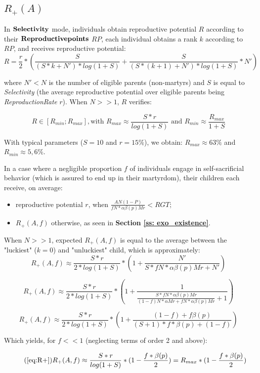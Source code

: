 \documentclass[a4paper,12pt]{report}
\begin{document}
\subsection{$R_{+}(A)$}
\label{ss:R+}
In $\bf{Selectivity}$ mode, individuals obtain reproductive potential $R$ according to their
$\bf{Reproductive points}$ $RP$, each individual obtains a rank $k$
according to $RP$, and receives reproductive potential:
\[ R = \frac{r}{2} * (\frac{S}
{(S*k + N')*log(1+S)} + \frac{S}{(S*(k+1) + N')*log(1+S)}*N') \]

where $N'<N$ is the number of eligible parents (non-martyrs) and $S$ is equal to \emph{Selectivity}
(the average reproductive potential over eligible parents being \emph{ReproductionRate} $r$).
When $N >> 1$, $R$ verifies:

\begin{equation}
    R \in [R_{min};R_{max}], \textrm{with } R_{max} \approx \frac{S*r}{log(1+S)} 
    \textrm{ and } R_{min} \approx
    \frac{R_{max}}{1+S}
\label{eq:ReproPot}
\end{equation}

With typical parameters ($S=10$ and $r=15\%$), we obtain: $R_{max} \approx 63 \%$ and 
$R_{min} \approx 5,6 \%$.

In a case where a negligible proportion $f$ of individuals engage in
self-sacrificial behavior (which is assured to end up in their martyrdom), their children each
receive, on average:
\begin{itemize}
\item reproductive potential $r$, when $\frac{AN(1-P)}{fN*\alpha\beta(p)Mr} < RGT$;
\item $R_{+}(A,f)$ otherwise, as seen in \textbf{Section \ref{ss: exo_existence}}.
\end{itemize}

When $N>>1$, expected $R_+(A,f)$ is equal to the average between the "luckiest" ($k=0$) and "unluckiest"
child, which is approximately:
\[ R_+(A,f) \approx \frac{S*r}{2*log(1+S)} * (1 + \frac{N'}{S*fN*\alpha\beta(p)Mr+N'})\]

\[ R_+(A,f) \approx \frac{S*r}{2*log(1+S)} * (1 + \frac{1}{\frac{S*fN*\alpha\beta(p)Mr}{(1-f)N*\alpha Mr + fN*\alpha\beta(p)Mr}+1})\]

\[ R_+(A,f) \approx \frac{S*r}{2*log(1+S)} * (1 + \frac{(1-f) + f\beta(p)}{(S+1)*f*\beta(p)+(1-f)})\]

Which yields, for $f<<1$ (neglecting terms of order 2 and above):

\begin{equation}
    \tag{\ref{eq:R+}}
    R_+(A,f) \approx  \frac{S*r}{log(1+S)} * (1 - \frac{f*\beta(p)}{2}) = R_{max}*(1-\frac{f*\beta(p)}{2})
\end{equation}
\end{document}
